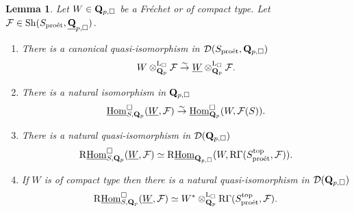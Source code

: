 \documentclass[10pt]{amsart}
\newtheorem{lemma}[equation]{Lemma}
\theoremstyle{definition}
\theoremstyle{remark}
\newcommand{\proeet}{\operatorname{pro\acute{e}t} }
\newcommand{\uHom}{\underline{{\rm{Hom}} }}
\newcommand{\LL}{\operatorname{L} }
\newcommand{\sff}{{\mathcal{F}}}
\newcommand{\sd}{{\mathcal{D}}}
\numberwithin{equation}{section}
\def\R{{\mathrm R}}
\def\Q{{\bf Q}} \def\Z{{\bf Z}}
\numberwithin{equation}{section}
\begin{document}
\begin{lemma}\label{form23} 
Let  $W\in \Q_{p,\Box}$ be a  Fr\'echet or of compact type. Let $\sff\in {\rm  Sh}(S_{\proeet}, \underline{\Q}_{p,\Box} )$.
\begin{enumerate}
\item    There is a canonical quasi-isomorphism in $\sd(S_{\proeet},\Q_{p,\Box})$
 \begin{equation}\label{form11-1}
  W\otimes^{\LL_{\Box}}_{\Q_{p}}\sff\stackrel{\sim}{\to}  \underline{W}\otimes^{\LL_{\Box}}_{\Q_{p}}\sff.
 \end{equation}
 
 \item   There is a natural isomorphism in $\Q_{p,\Box}$
$$\uHom^{\Box}_{S,\Q_p}(\underline{W} ,\sff) \stackrel{\sim}{\to}  \uHom^{\Box}_{ \Q_p} (W,\sff(S)).$$

\item   There is a natural quasi-isomorphism in $\sd(\Q_{p,\Box})$
$$\R\uHom^{\Box}_{S,\Q_p}(\underline{W},\sff) \simeq  \R\uHom_{\Q_{p,\Box}} (W,\R\Gamma(S^{\rm top}_{\proeet},\sff)).
$$
\item   If $W$ is of compact type then  there is a natural quasi-isomorphism in $\sd(\Q_{p,\Box})$
$$\R\uHom^{\Box}_{S,\Q_p}(\underline{W},\sff) \simeq  W^*\otimes^{\LL_{\Box}}_{\Q_p}\R\Gamma(S^{\rm top}_{\proeet},\sff).
$$
\end{enumerate}
\end{lemma}
\end{document}
